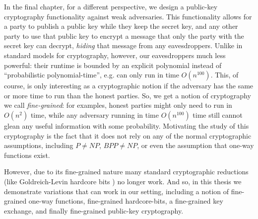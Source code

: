 In the final chapter, for a different perspective, we design a public-key cryptography functionality against weak adversaries. This functionality allows for a party to publish a public key while they keep the secret key, and any other party to use that public key to encrypt a message that only the party with the secret key can decrypt, \emph{hiding} that message from any eavesdroppers. Unlike in standard models for cryptography, however, our eavesdroppers much less powerful: their runtime is bounded by an explicit polynomial instead of ``probabilistic polynomial-time'', e.g. can only run in time $O(n^{100})$. This, of course, is only interesting as a cryptographic notion if the adversary has the same or more time to run than the honest parties. So, we get a notion of cryptography we call \emph{fine-grained}: for examples, honest parties might only need to run in $O(n^2)$ time, while any adversary running in time $O(n^{100})$ time still cannot glean any useful information with some probability. Motivating the study of this cryptography is the fact that it does not rely on any of the normal cryptographic assumptions, including $P \neq NP$, $BPP \neq NP$, or even the assumption that one-way functions exist.

However, due to its fine-grained nature many standard cryptographic reductions (like Goldreich-Levin hardcore bits \cite{hardCoreBitsAndXorLemmaFromGL}) no longer work. And so, in this thesis we demonstrate variations that can work in our setting, including a notion of fine-grained one-way functions, fine-grained hardcore-bits, a fine-grained key exchange, and finally fine-grained public-key cryptography.



